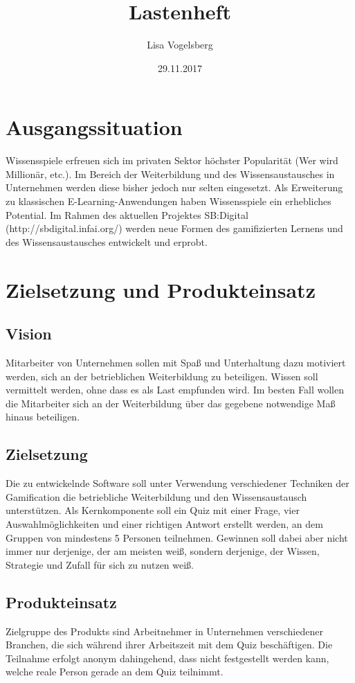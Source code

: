 \documentclass[11pt,a4paper]{scrreprt}
\title{Lastenheft}
\author{Lisa Vogelsberg}
\date{29.11.2017}
\begin{document}
\tableofcontents

\chapter{Ausgangssituation}
Wissensspiele erfreuen sich im privaten Sektor höchster Popularität (Wer wird Millionär, etc.). Im Bereich der Weiterbildung und des Wissensaustausches in Unternehmen werden diese bisher jedoch nur selten eingesetzt. Als Erweiterung zu klassischen E-Learning-Anwendungen haben Wissensspiele ein erhebliches Potential. Im Rahmen des aktuellen Projektes SB:Digital (http://sbdigital.infai.org/) werden neue Formen des gamifizierten Lernens und des Wissensaustausches entwickelt und erprobt.

\chapter{Zielsetzung und Produkteinsatz}
\section{Vision}
Mitarbeiter von Unternehmen sollen mit Spaß und Unterhaltung dazu motiviert werden, sich an der betrieblichen Weiterbildung zu beteiligen. Wissen soll vermittelt werden, ohne dass es als Last empfunden wird. Im besten Fall wollen die Mitarbeiter sich an der Weiterbildung über das gegebene notwendige Maß hinaus beteiligen.
\section{Zielsetzung}
Die zu entwickelnde Software soll unter Verwendung verschiedener Techniken der Gamification die betriebliche Weiterbildung und den Wissensaustausch unterstützen.
Als Kernkomponente soll ein Quiz mit einer Frage, vier Auswahlmöglichkeiten und einer richtigen Antwort erstellt werden, an dem Gruppen von mindestens 5 Personen teilnehmen.
Gewinnen soll dabei aber nicht immer nur derjenige, der am meisten weiß, sondern derjenige, der Wissen, Strategie und Zufall für sich zu nutzen weiß.
\section{Produkteinsatz}
Zielgruppe des Produkts sind Arbeitnehmer in Unternehmen verschiedener Branchen, die sich während ihrer Arbeitszeit mit dem Quiz beschäftigen. Die Teilnahme erfolgt anonym dahingehend, dass nicht festgestellt werden kann, welche reale Person gerade an dem Quiz teilnimmt.
\end{document}
